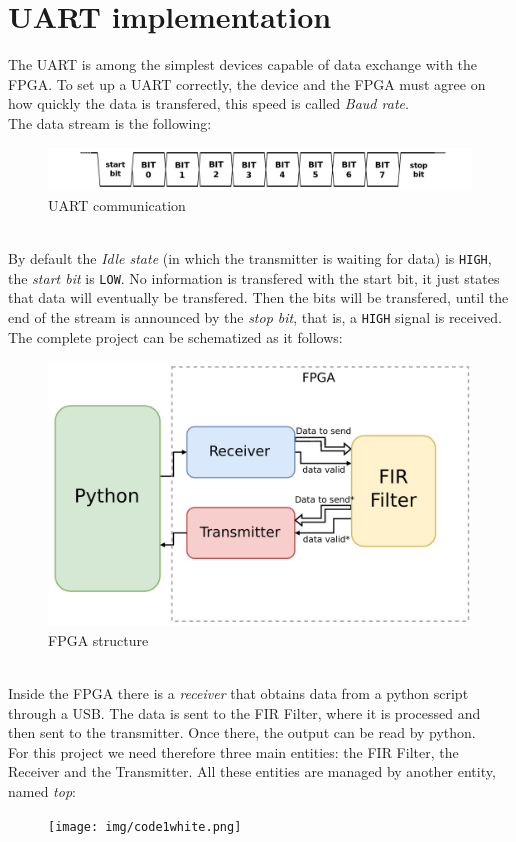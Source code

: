 \documentclass[11pt,a4paper,twocolumn]{IEEEtran}
\begin{document}
	\section{UART implementation}
	The UART is among the simplest devices capable of data exchange with the FPGA.
	To set up a UART correctly, the device and the FPGA must agree on how quickly the data is transfered, this speed is called \emph{Baud rate}.\\
	The data stream is the following:
	\begin{figure}[h]
		\centering
		\includegraphics[width=1\linewidth]{img/UART_timing_diagram}
		\caption{UART communication}
	\end{figure}\\
	By default the \emph{Idle state} (in which the transmitter is waiting for data) is \texttt{HIGH}, the \emph{start bit} is \texttt{LOW}. No information is transfered with the start bit, it just states that data will eventually be transfered. Then the bits will be transfered, until the end of the stream is announced by the \emph{stop bit}, that is, a \texttt{HIGH} signal is received.\newpage
	The complete project can be schematized as it follows:
	\begin{figure}[h]
		\centering
		\includegraphics[width=1\linewidth]{img/projectcompletepdf}
		\caption{FPGA structure}
		\label{fig:fpgastruct}
	\end{figure}\\
	Inside the FPGA there is a \emph{receiver} that obtains data from a python script through a USB. The data is sent to the FIR Filter, where it is processed and then sent to the transmitter. Once there, the output can be read by python.\\
	For this project we need therefore three main entities: the FIR Filter, the Receiver and the Transmitter. All these entities are managed by another entity, named \emph{top}:
	\begin{figure}[h]
		\centering
		\vspace*{-.4cm}
		\hspace*{-.8cm}\texttt{[image: img/code1white.png]}
	\end{figure}
	\newpage
\end{document}
